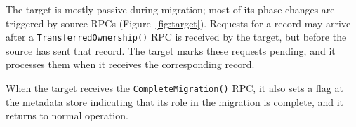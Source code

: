 The target is mostly passive during migration; most of its phase changes are
triggered by source RPCs (Figure~\ref{fig:target}).
%
Requests for a record may arrive after a \texttt{TransferredOwnership()} RPC is received by the target, but before the
source has sent that record.
%
The target marks these requests pending, and it processes them when it receives
the corresponding record.

When the target receives the \texttt{CompleteMigration()} RPC,
%
it also sets a flag at the metadata store indicating that its role in the
migration is complete, and it returns to normal operation.

%

%

